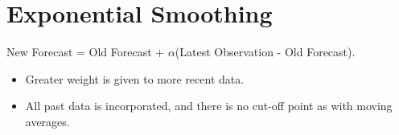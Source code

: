 \section{Exponential Smoothing}

New Forecast = Old Forecast + $\alpha$(Latest Observation - Old Forecast).

\begin{itemize}
\item Greater weight is given to more recent data.
\item All past data is incorporated, and there is no cut-off point as with moving averages.
\end{itemize}


